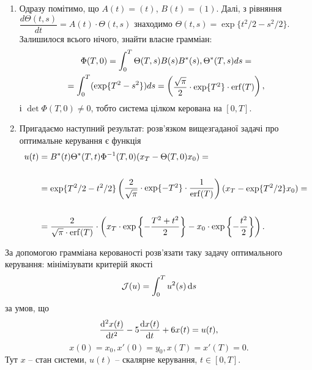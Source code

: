 \begin{solution}
\begin{enumerate}
    \item Одразу помітимо, що $A(t) = (t)$, $B(t) = (1)$. Далі, з рівняння $\dfrac{d\Theta(t,s)}{dt} = A(t) \cdot \Theta(t,s)$ знаходимо $\Theta(t,s) = \exp\{t^2 / 2 - s^2 / 2\}$. Залишилося всього нічого, знайти власне грамміан:
    \begin{multline*} \Phi(T,0) = \int_0^T \Theta(T,s)B(s)B^*(s),\Theta^*(T,s) ds = \\ = \int_0^T (\exp\{T^2 - s^2\}) ds = \begin{pmatrix}\dfrac{\sqrt \pi}{2} \cdot \exp\{T^2\} \cdot \operatorname{erf}(T) \end{pmatrix}, \end{multline*} і $\det\Phi(T,0)\ne0$, тобто система цілком керована на $[0, T]$.
    \item Пригадаємо наступний результат: розв'язком вищезгаданої задачі про оптимальне керування є функція
    \begin{align*}
        u(t) &= B^*(t) \Theta^*(T,t)\Phi^{-1}(T,0)(x_T-\Theta(T,0) x_0) = \\
        \\
        &= \exp\{T^2 / 2 - t^2 / 2\} \begin{pmatrix}\dfrac2{\sqrt \pi} \cdot \exp\{-T^2\} \cdot \dfrac1{\operatorname{erf}(T)} \end{pmatrix} (x_T - \exp\{T^2 / 2\} x_0) = \\
        \\
        &= \dfrac{2}{\sqrt{\pi}\cdot \operatorname{erf}(T)} \cdot \left(x_T \cdot \exp\left\{-\dfrac{T^2+t^2}2\right\} - x_0 \cdot \exp\left\{- \dfrac{t^2}2\right\}\right).
    \end{align*} 
\end{enumerate}
\end{solution} 

\begin{problem}
    За допомогою грамміана керованості розв'язати таку задачу оптимального керування: мінімізувати критерій якості \[ \mathcal{J} (u) = \int_0^T u^2(s) \mathop{}\!\mathrm{d} s \] за умов, що \[ \frac{\mathop{}\!\mathrm{d}^2 x(t)}{\mathop{}\!\mathrm{d} t^2} - 5 \frac{\mathop{}\!\mathrm{d} x(t)}{\mathop{}\!\mathrm{d} t} + 6 x(t) = u(t), \] \[ x(0) = x_0, x'(0) = y_0,x(T)=x'(T)=0.\] Тут $x$ -- стан системи, $u(t)$ -- скалярне керування, $t\in[0,T]$.
\end{problem}

\begin{solution}
\end{solution}

